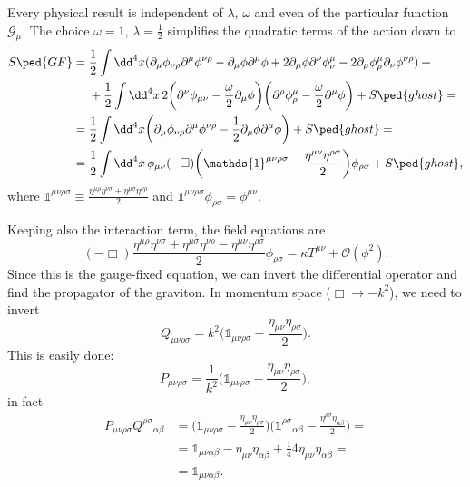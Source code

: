 \documentclass[a4paper,12pt]{book}
\begin{document}
Every physical result is independent of $\lambda$, $\omega$ and even of the particular function $\mathcal G_\mu$. The choice $\omega=1$, $\lambda=\frac12$ simplifies the quadratic terms of the action down to
\begin{align*}
S\ped{GF}={}&\frac12\int\dd^4x(\partial_\mu\phi_{\nu\rho}\partial^\mu\phi^{\nu\rho}-\partial_\mu\phi\partial^\mu\phi+2\partial_\mu\phi\partial^\nu\phi^\mu_\nu-2\partial_\mu\phi^\mu_\rho\partial_\nu\phi^{\nu\rho})+{}\\
&+\frac12\int\dd^4x\,2\biggl(\partial^\nu\phi_{\mu\nu}-\frac\omega2\partial_\mu\phi\biggr)\biggl(\partial^\rho\phi_\rho^\mu-\frac\omega2\partial^\mu\phi\biggr)+S\ped{ghost}=\\
={}&\frac12\int\dd^4x\biggl(\partial_\mu\phi_{\nu\rho}\partial^\mu\phi^{\nu\rho}-\frac12\partial_\mu\phi\partial^\mu\phi\biggr)+S\ped{ghost}=\\
={}&\frac12\int\dd^4x\,\phi_{\mu\nu}(-\Box)\biggl(\mathds{1}^{\mu\nu\rho\sigma}-\frac{\eta^{\mu\nu}\eta^{\rho\sigma}}2\biggr)\phi_{\rho\sigma}+S\ped{ghost},
\end{align*}
where $\mathds{1}^{\mu\nu\rho\sigma}\equiv\frac{\eta^{\mu\rho}\eta^{\nu\sigma}+\eta^{\mu\sigma}\eta^{\nu\rho}}2$ and $\mathds{1}^{\mu\nu\rho\sigma}\phi_{\rho\sigma}=\phi^{\mu\nu}$.

Keeping also the interaction term, the field equations are
\[(-\Box)\frac{\eta^{\mu\rho}\eta^{\nu\sigma}+\eta^{\mu\sigma}\eta^{\nu\rho}-\eta^{\mu\nu}\eta^{\rho\sigma}}2\phi_{\rho\sigma}=\kappa T^{\mu\nu}+\mathcal O(\phi^2).\]
Since this is the gauge-fixed equation, we can invert the differential operator and find the propagator of the graviton. In momentum space ($\Box\to-k^2$), we need to invert
\[Q_{\mu\nu\rho\sigma}=k^2\biggl(\mathds{1}_{\mu\nu\rho\sigma}-\frac{\eta_{\mu\nu}\eta_{\rho\sigma}}2\biggr).\]
This is easily done:
\[P_{\mu\nu\rho\sigma}=\frac1{k^2}\biggl(\mathds{1}_{\mu\nu\rho\sigma}-\frac{\eta_{\mu\nu}\eta_{\rho\sigma}}2\biggr),\]
in fact
\begin{align*}
P_{\mu\nu\rho\sigma}Q^{\rho\sigma}{}_{\alpha\beta}&=\biggl(\mathds{1}_{\mu\nu\rho\sigma}-\frac{\eta_{\mu\nu}\eta_{\rho\sigma}}2\biggr)\biggl(\mathds{1}^{\rho\sigma}{}_{\alpha\beta}-\frac{\eta^{\rho\sigma}\eta_{\alpha\beta}}2\biggr)=\\
&=\mathds{1}_{\mu\nu\alpha\beta}-\eta_{\mu\nu}\eta_{\alpha\beta}+\frac144\eta_{\mu\nu}\eta_{\alpha\beta}=\\
&=\mathds{1}_{\mu\nu\alpha\beta}.
\end{align*}
\end{document}
